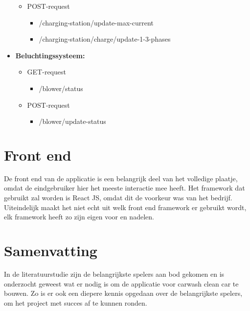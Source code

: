 \begin{itemize}
\begin{itemize}
              \item POST-request
                    \begin{itemize}
                        \item /charging-station/update-max-current
                        \item /charging-station/charge/update-1-3-phases
                    \end{itemize}
          \end{itemize}
    \item \textbf{Beluchtingssysteem:}
          \begin{itemize}
              \item GET-request
                    \begin{itemize}
                        \item /blower/status
                    \end{itemize}
              \item POST-request
                    \begin{itemize}
                        \item /blower/update-status
                    \end{itemize}
          \end{itemize}
\end{itemize}

\section{Front end}
\label{sec:stand-van-zaken-front-end}

De front end van de applicatie is een belangrijk deel van het volledige plaatje, omdat de eindgebruiker hier het meeste interactie mee heeft. Het framework dat gebruikt zal worden is React JS, omdat dit de voorkeur was van het bedrijf.\\

Uiteindelijk maakt het niet echt uit welk front end framework er gebruikt wordt, elk framework heeft zo zijn eigen voor en nadelen.

\section{Samenvatting}
\label{sec:stand-van-zaken-samenvatting}

In de literatuurstudie zijn de belangrijkste spelers aan bod gekomen en is onderzocht geweest wat er nodig is om de applicatie voor carwash clean car te bouwen. Zo is er ook een diepere kennis opgedaan over de belangrijkste spelers, om het project met succes af te kunnen ronden. \\

